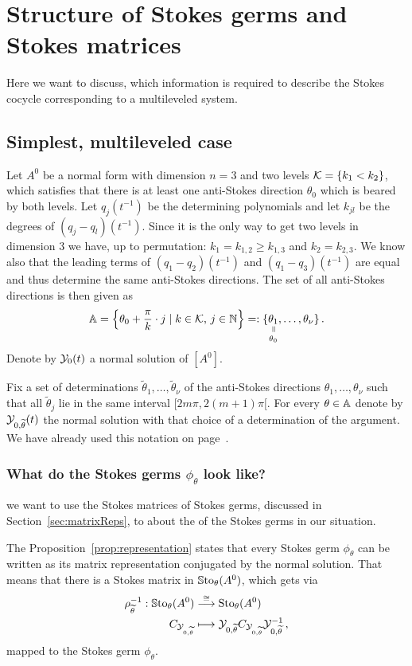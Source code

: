 \chapter{Structure of Stokes germs and Stokes
  matrices}\label{chp:WhichInformationIsNeeded}
Here we want to discuss, which information is required to describe the Stokes
cocycle corresponding to a multileveled system.
\section{Simplest, multileveled case}
Let $A^0$ be a normal form with dimension $n=3$ and two levels
$\mathcal{K}=\{k_1<k_2\}$, which satisfies that there is at least one anti-Stokes
direction $\theta_0$ which is beared by both levels.
Let $q_j(t^{-1})$ be the determining polynomials and let $k_{jl}$ be the
degrees of $(q_j-q_l)(t^{-1})$.
Since it is the only way to get two levels in dimension $3$ we have, up to
permutation: $k_1=k_{1,2}\geq k_{1,3}$ and $k_2=k_{2,3}$.
We know also that the leading terms of $(q_1-q_2)(t^{-1})$ and
$(q_1-q_3)(t^{-1})$ are equal and thus determine the same anti-Stokes
directions.
The set of all anti-Stokes directions is then given as
\[
  \A=\left\{\theta_0+\frac{\pi}{k}\cdot j\mid k\in\cK\text{, }j\in\N\right\}
    =:\{
      \underset{\theta_0}{%
        \underset{\text{\rotatebox[origin=c]{-90}{$=$}}}{%
          \theta_1
      }}
    ,\dots,\theta_\nu\}\,.
\]
Denote by $\mathcal{Y}_0(t)$ a normal solution of $[A^0]$.

Fix a set of determinations $\tilde\theta_1,\dots,\tilde\theta_\nu$ of the
anti-Stokes directions $\theta_1,\dots,\theta_\nu$ such that all
$\tilde\theta_j$ lie in the same interval $[2m\pi,2(m+1)\pi[$.
For every $\theta\in\mathbb{A}$ denote by $\mathcal{Y}_{0,\widetilde\theta}(t)$ the normal solution
with that choice of a determination of the argument. We have already used this
notation on page~\pageref{page:alreadyUsedDefn}.

\subsection{What do the Stokes germs $\phi_\theta$ look like?}
 we want to use the Stokes matrices of Stokes germs, discussed
in Section~\ref{sec:matrixReps}, to  about the
 of the Stokes germs in our situation.

The Proposition~\ref{prop:representation} states that every Stokes germ
$\phi_\theta$ can be written as its matrix representation conjugated by the
normal solution. That means that there is a Stokes matrix in
$\operatorname{\mathbb{S}to}_\theta(A^0)$, which gets via
\begin{align*}
  \rho_{\widetilde\theta}^{-1}:
  \operatorname{\mathbb{S}to}_\theta(A^0)
  &\overset{\cong}\longrightarrow
  \operatorname{Sto}_\theta(A^0)
  \\C_{\mathcal{Y}_{0,\widetilde\theta}} &\longmapsto
  \mathcal{Y}_{0,\widetilde\theta} C_{\mathcal{Y}_{0,\widetilde\theta}} \mathcal{Y}_{0,\widetilde\theta}^{-1} \,,
\end{align*}
mapped to the Stokes germ $\phi_\theta$.

